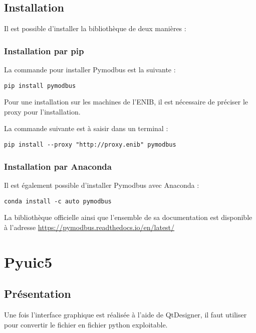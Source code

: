 \subsection{Installation}

Il est possible d'installer la bibliothèque  de deux manières : \newline

\subsubsection{Installation par pip}
La commande pour installer Pymodbus est la suivante :
\begin{lstlisting}
pip install pymodbus
\end{lstlisting}

Pour une installation sur les machines de l'ENIB, il est nécessaire de préciser le proxy pour l'installation. \newline 

La commande suivante est à saisir dans un terminal :
\begin{lstlisting}
pip install --proxy "http://proxy.enib" pymodbus
\end{lstlisting}

\subsubsection{Installation par Anaconda}
 Il est également possible d'installer Pymodbus avec Anaconda : 
\begin{lstlisting}
conda install -c auto pymodbus
\end{lstlisting}

La bibliothèque officielle ainsi que l'ensemble de sa documentation est disponible à l'adresse \url{https://pymodbus.readthedocs.io/en/latest/} \newline 

\section{Pyuic5}

\subsection{Présentation}

Une fois l'interface graphique est réalisée à l'aide de QtDesigner, il faut utiliser  pour convertir le fichier  en fichier python exploitable.\newline

